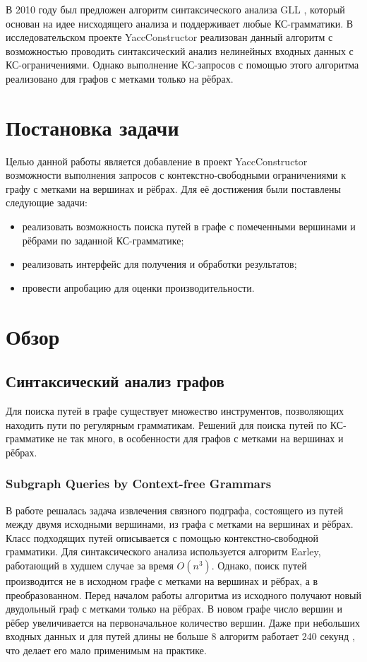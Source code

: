 \documentclass[14pt]{matmex-diploma}
\begin{document}
  В 2010 году был предложен алгоритм синтаксического анализа GLL \cite{gll}, который основан на идее нисходящего анализа и  поддерживает любые КС-грамматики. В исследовательском проекте YaccConstructor \cite{YaccConstructorPage} реализован данный алгоритм с возможностью проводить синтаксический анализ нелинейных входных данных с КС-ограничениями. Однако выполнение КС-запросов с помощью этого алгоритма реализовано для графов с метками только на рёбрах.

\section{Постановка задачи}

Целью данной работы является добавление в проект YaccConstructor возможности выполнения запросов с контекстно-свободными ограничениями к графу с метками на вершинах и рёбрах. Для её достижения были поставлены следующие задачи:

\begin{itemize}
    \item реализовать возможность поиска путей в графе с помеченными вершинами и рёбрами по заданной КС-грамматике;
    \item реализовать интерфейс для получения и обработки результатов;
    \item провести апробацию для оценки производительности.
    
\end{itemize}

\section{Обзор}

\subsection{Синтаксический анализ графов}

Для поиска путей в графе существует множество инструментов, позволяющих находить пути по регулярным грамматикам. Решений для поиска путей по КС-грамматике не так много, в особенности для графов с метками на вершинах и рёбрах.

\subsubsection{Subgraph Queries by Context-free Grammars}
В работе \cite{subgraph} решалась задача извлечения связного подграфа, состоящего из путей между двумя исходными вершинами, из графа с метками на вершинах и рёбрах. Класс подходящих путей описывается с помощью контекстно-свободной грамматики. Для синтаксического анализа используется алгоритм Earley, работающий в худшем случае за время $O(n^3)$. Однако, поиск путей производится не в исходном графе с метками на вершинах и рёбрах, а в преобразованном. Перед началом работы алгоритма из исходного получают новый двудольный граф с метками только на рёбрах. В новом графе число вершин и рёбер увеличивается на первоначальное количество вершин. Даже при небольших входных данных и для путей длины не больше 8 алгоритм работает 240 секунд \cite{subgraph}, что делает его мало применимым на практике.
\end{document}
